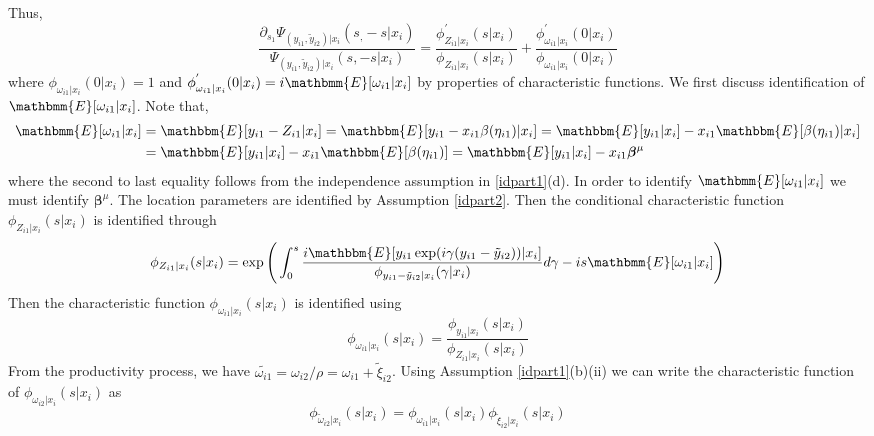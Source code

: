\documentclass[11pt]{article}
\begin{document}
Thus,
\begin{equation*}
\frac{\partial_{s_{1}}\Psi_{(y_{i1}, \tilde{y}_{i2})|x_{i}}(s_, -s|x_{i})}{\Psi_{(y_{i1}, \tilde{y}_{i2})|x_{i}}(s, -s|x_{i})}=\frac{\phi^{'}_{Z_{i1}|x_{i}}(s|x_{i})}{\phi_{Z_{i1}|x_{i}}(s|x_{i})}+\frac{\phi^{'}_{\omega_{i1}|x_{i}}(0|x_{i})}{\phi_{\omega_{i1}|x_{i}}(0|x_{i})}
\end{equation*}
where $\phi_{\omega_{i1}|x_{i}}(0|x_{i})=1$ and $\phi^{'}_{\omega_{i1}|x_{i}}(0|x_{i})=i\mathbmm{E}[\omega_{i1}|x_{i}]$ by properties of characteristic functions. We first discuss identification of $\mathbmm{E}[\omega_{i1}|x_{i}]$. Note that,
\begin{equation*}
\begin{split}
\mathbmm{E}[\omega_{i1}|x_{i}]&=\mathbbm{E}[y_{i1}-Z_{i1}|x_{i}]=\mathbbm{E}[y_{i1}-x_{i1}\beta(\eta_{i1})|x_{i}]=\mathbbm{E}[y_{i1}|x_{i}]-x_{i1}\mathbbm{E}[\beta(\eta_{i1})|x_{i}]\\
&=\mathbbm{E}[y_{i1}|x_{i}]-x_{i1}\mathbbm{E}[\beta(\eta_{i1})]=\mathbbm{E}[y_{i1}|x_{i}]-x_{i1}\boldsymbol{\beta}^{\mu}
\end{split}
\end{equation*}
where the second to last equality follows from the independence assumption in \eqref{idpart1}(d). In order to identify $\mathbmm{E}[\omega_{i1}|x_{i}]$ we must identify $\boldsymbol{\beta}^{\mu}$. The location parameters are identified by Assumption \ref{idpart2}. Then the conditional characteristic function $\phi_{Z_{i1}|x_{i}}(s|x_{i})$ is identified through
\begin{equation*}
\phi_{Z_{i1}|x_{i}}(s|x_{i})=\exp\Bigg(\int_{0}^{s}\frac{i\mathbbm{E}[y_{i1}\exp(i\gamma(y_{i1}-\tilde{y}_{i2}))|x_{i}]}{\phi_{y_{i1}-\tilde{y}_{i2}|x_{i}}(\gamma|x_{i})}d\gamma-is\mathbmm{E}[\omega_{i1}|x_{i}]\Bigg)
\end{equation*}
Then the characteristic function $\phi_{\omega_{i1}|x_{i}}(s|x_{i})$ is identified using
\begin{equation*}
\phi_{\omega_{i1}|x_{i}}(s|x_{i})=\frac{\phi_{y_{i1}|x_{i}}(s|x_{i})}{\phi_{Z_{i1}|x_{i}}(s|x_{i})}
\end{equation*}
From the productivity process, we have $\tilde{\omega_{i1}}=\omega_{i2}/\rho=\omega_{i1}+\tilde{\xi}_{i2}$. Using Assumption \ref{idpart1}(b)(ii) we can write the characteristic function of $\phi_{\omega_{i2}|x_{i}}(s|x_{i})$ as
\begin{equation*}
\phi_{\tilde{\omega}_{i2}|x_{i}}(s|x_{i})=\phi_{\omega_{i1}|x_{i}}(s|x_{i})\phi_{\tilde{\xi}_{i2}|x_{i}}(s|x_{i})
\end{equation*}
\end{document}
